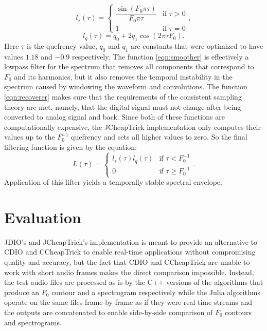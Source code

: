 \documentclass[a4paper]{article}
\begin{document}
\begin{equation}\label{eqn:smoother}
    l_s(\tau) =  \begin{cases}
        \dfrac{\sin(F_0 \pi \tau)}{F_0 \pi \tau} & \text{if $\tau > 0$} \\
        1 & \text{if $\tau = 0$}
    \end{cases},
\end{equation}
\begin{equation}\label{eqn:recoverer}
    l_q(\tau) = q_0 + 2q_1\cos(2 \pi \tau F_0).
\end{equation}
Here $\tau$ is the quefrency value, $q_0$ and $q_1$ are constants that were optimized to have values $1.18$ and $-0.9$ respectively. The function \eqref{eqn:smoother} is effectively a lowpass filter for the spectrum that removes all components that correspond to $F_0$ and its harmonics, but it also removes the temporal instability in the spectrum caused by windowing the waveform and convolutions. The function \eqref{eqn:recoverer} makes sure that the requirements of the consistent sampling theory are met, namely, that the digital signal must not change after being converted to analog signal and back. Since both of these functions are computationally expensive, the JCheapTrick implementation only computes their values up to the $F_0^{-1}$ quefrency and sets all higher values to zero. So the final liftering function is given by the equation:
\begin{equation}\label{eqn:lifter}
    L(\tau) = \begin{cases}
        l_s(\tau)l_q(\tau) & \text{if $\tau < F_0^{-1}$} \\
        0 & \text{if $\tau \geq F_0^{-1}$}
    \end{cases}.
\end{equation}
Application of this lifter yields a temporally stable spectral envelope.

\section{Evaluation}

JDIO's and JCheapTrick's implementation is meant to provide an alternative to CDIO and CCheapTrick to enable real-time applications without compromising quality and accuracy, but the fact that CDIO and CCheapTrick are unable to work with short audio frames makes the direct comparison impossible. Instead, the test audio files are processed as is by the C++ versions of the algorithms that produce an $F_0$ contour and a spectrogram respectively while the Julia algorithms operate on the same files frame-by-frame as if they were real-time streams and the outputs are concatenated to enable side-by-side comparison of $F_0$ contours and spectrograms.
\end{document}
